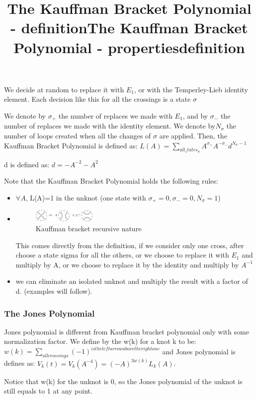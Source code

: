\documentclass{article}
\begin{document}
We decide at random to replace it with $E_{1}$, or with the Temperley-Lieb identity element.
Each decision like this for all the crossings is a state $\sigma$

\title{The Kauffman Bracket Polynomial - definition} 
We denote by $\sigma_{+}$ the number of replaces we made with $E_{1}$, and by 
$\sigma_{-}$ the number of replaces we made with the identity element.
We denote by$N_{\sigma}$ the number of loops created when all the changes of $\sigma$ are applied.
Then, the Kauffman Bracket Polynomial is defined as:
$ L(A) = \sum\limits_{all_states_\sigma}{A^{\sigma_{+}} A^{-\sigma_{-}}d^{N_{\sigma} - 1}}$

d is defined as: $d = -A^{-2} -A^2$ 



\title{The Kauffman Bracket Polynomial - properties} 
Note that the  Kauffman Bracket Polynomial holds the following rules:
\begin{itemize}
\item $\forall A$, L(A)=1 in the unknot (one state with $\sigma_{+}=0,\sigma_{-}=0, N_{\sigma} = 1$)
\item 
\begin{figure}
\includegraphics[scale=1]{Kauffman_bracket_identity} 
\caption{Kauffman bracket recursive nature}
\end{figure}
This comes directly from the definition, if we consider only one cross, after choose a state sigma for all the others, or we choose to replace it with $E_{1}$ and multiply by A, or we choose to replace it by the identity and multiply by $A^{-1}$
\item we can eliminate an isolated unknot and multiply the result with a factor of d. (examples will follow). 
\end{itemize}


\subsubsection{The Jones Polynomial}
\title{definition}
Jones polynomial is different from Kauffman bracket polynomial only with some normalization factor.
We define by the w(k) for a knot k to be: $w(k) = \sum\limits_{all crossings}{(-1)^{is the left arrow above the right one}}$
and Jones polynomial is defines as: $V_{k}(t)=V_{k}(A^{-4})=(-A)^{3w(k)}L_{k}(A)$.

Notice that w(k) for the unknot is 0, so the Jones polynomial of the unknot is still equals to 1 at any point.
\end{document}
